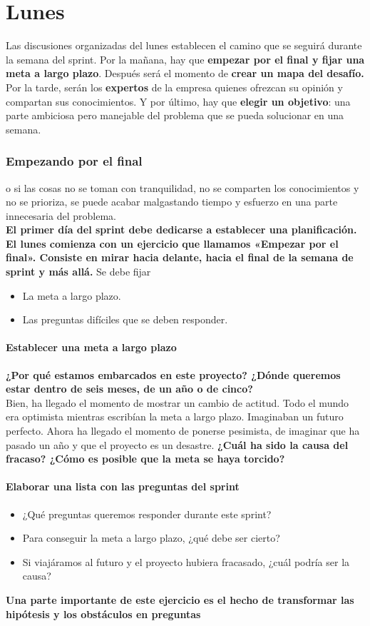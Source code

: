 \documentclass[10pt]{article}
\begin{document}
\part*{\center Lunes}
Las discusiones organizadas del lunes establecen el camino que se seguirá durante la semana del sprint. Por la mañana, hay que \textbf{empezar por el final y fijar una meta a largo plazo}. Después será el momento de \textbf{crear un mapa del desafío.} Por la tarde, serán los \textbf{expertos} de la  empresa quienes ofrezcan su opinión y compartan sus conocimientos. Y por último, hay que \textbf{elegir un objetivo}: una parte ambiciosa pero manejable del problema que se pueda solucionar en una semana.
\begin{multicols}{2}
\section*{Empezando por el final}
o si las cosas no se toman con tranquilidad, no se comparten los conocimientos y no se prioriza, se puede acabar malgastando tiempo y esfuerzo en una parte innecesaria del problema.\\
\textbf{ El primer día del sprint debe dedicarse a establecer una planificación. \\
El lunes comienza con un ejercicio que llamamos «Empezar por el final». Consiste en mirar hacia delante, hacia el final de la semana de sprint y más allá.} Se debe fijar
\begin{itemize}
\item La meta a largo plazo.
\item Las preguntas difíciles que se deben responder.
\end{itemize} 
\subsection*{Establecer una meta a largo plazo}
\textbf{¿Por qué estamos embarcados en este proyecto? ¿Dónde queremos estar dentro de seis meses, de un año o de cinco?}\\
Bien, ha llegado el momento de mostrar un cambio de actitud. Todo el mundo era optimista mientras escribían la meta a largo plazo. Imaginaban un futuro perfecto. Ahora ha llegado el momento de ponerse pesimista, de imaginar que ha pasado un año y que el proyecto es un desastre. \textbf{¿Cuál ha sido la causa del fracaso? ¿Cómo es posible que la meta se haya torcido?}\\
\subsection*{Elaborar una lista con las preguntas del sprint}
\begin{itemize}
\item ¿Qué preguntas queremos responder durante este sprint?
\item Para conseguir la meta a largo plazo, ¿qué debe ser cierto?
\item Si viajáramos al futuro y el proyecto hubiera fracasado, ¿cuál
podría ser la causa?
\end{itemize}
\textbf{Una parte importante de este ejercicio es el hecho de transformar las hipótesis y los obstáculos en preguntas}\\

\end{multicols}
\end{document}
